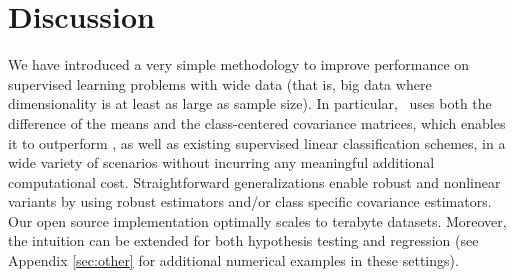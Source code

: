 \documentclass[11pt]{extarticle}
\begin{document}

\section*{Discussion}




We have introduced a very simple methodology to improve performance on supervised learning problems with  wide data (that is, big data where dimensionality is at least as large as sample size).
In particular, \Lol~uses both the difference of the means and the class-centered covariance matrices, which enables it to outperform \Pca, as well as existing supervised linear classification schemes, in a wide variety of scenarios without incurring any meaningful additional computational cost. Straightforward generalizations enable robust and nonlinear variants by using robust estimators and/or class specific covariance estimators.
Our open source implementation optimally scales to terabyte datasets. Moreover, the intuition can be extended for both hypothesis testing and regression  (see Appendix \ref{sec:other} for additional numerical examples in these settings).
\end{document}
